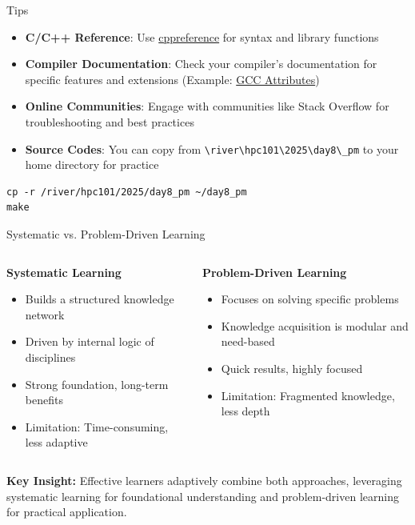 \begin{frame}[fragile]{ Tips}
	\begin{itemize}
		\item \textbf{C/C++ Reference}: Use \textcolor{blue}{\href{https://en.cppreference.com/}{cppreference}} for syntax and library functions
		\item \textbf{Compiler Documentation}: Check your compiler's documentation for specific features and extensions (Example: \textcolor{blue}{\href{https://gcc.gnu.org/onlinedocs/gcc/Attributes.html}{GCC Attributes}})
		\item \textbf{Online Communities}: Engage with communities like Stack Overflow for troubleshooting and best practices
        \item \textbf{Source Codes}: You can copy from \verb|\river\hpc101\2025\day8\_pm| to your home directory for practice
	\end{itemize}
    \begin{verbatim}
cp -r /river/hpc101/2025/day8_pm ~/day8_pm
make
    \end{verbatim}
\end{frame}

\begin{frame}[fragile]{ Systematic vs. Problem-Driven Learning}
	\scriptsize
	\begin{columns}
		\begin{column}{0.5\textwidth}
			\textbf{Systematic Learning}
			\begin{itemize}
				\item Builds a structured knowledge network
				\item Driven by internal logic of disciplines
				\item Strong foundation, long-term benefits
				\item Limitation: Time-consuming, less adaptive
			\end{itemize}
		\end{column}
		\begin{column}{0.5\textwidth}
			\textbf{Problem-Driven Learning}
			\begin{itemize}
				\item Focuses on solving specific problems
				\item Knowledge acquisition is modular and need-based
				\item Quick results, highly focused
				\item Limitation: Fragmented knowledge, less depth
			\end{itemize}
		\end{column}
	\end{columns}
	\vspace{0.5cm}
	\textbf{Key Insight:} Effective learners adaptively combine both approaches, leveraging systematic learning for foundational understanding and problem-driven learning for practical application.
\end{frame}

